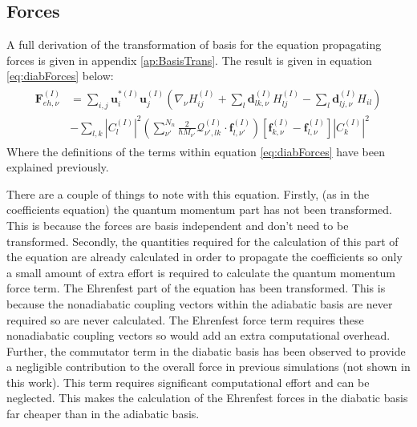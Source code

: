 \subsection{Forces}
A full derivation of the transformation of basis for the equation propagating forces is given in appendix \ref{ap:BasisTrans}. The result is given in equation \eqref{eq:diabForces} below:
\begin{align}
  \begin{split}
	  \mathbf{F}_{eh, \nu}^{(I)} &= \sum_{i,j} \mathbf{u}_{i}^{*(I)} \mathbf{u}_{j}^{(I)} \left( \nabla_{\nu} H_{ij}^{(I)} + \sum_{l} \mathbf{d}_{lk, \nu}^{(I)} H_{lj}^{(I)} - \sum_{l} \mathbf{d}_{lj, \nu}^{(I)} H_{il} \right) \\
	  &- \sum_{l,k} |C_{l}^{(I)}|^2 \left( \sum_{\nu'}^{N_{n}} \frac{2}{\hbar M_{\nu'}} \mathcal{Q}_{\nu', lk}^{(I)} \cdot                   \mathbf{f}_{l, \nu'}^{(I)} \right)\left[ \mathbf{f}_{k, \nu}^{(I)} -          \mathbf{f}_{l, \nu}^{(I)} \right] |C_{k}^{(I)}|^2
	\end{split}
  \label{eq:diabForces}
\end{align}
Where the definitions of the terms within equation \eqref{eq:diabForces} have been explained previously.

\noindent There are a couple of things to note with this equation. Firstly, (as in the coefficients equation) the quantum momentum part has not been transformed. This is because the forces are basis independent and don't need to be transformed. Secondly, the quantities required for the calculation of this part of the equation are already calculated in order to propagate the coefficients so only a small amount of extra effort is required to calculate the quantum momentum force term. The Ehrenfest part of the equation has been transformed. This is because the nonadiabatic coupling vectors within the adiabatic basis are never required so are never calculated. The Ehrenfest force term requires these nonadiabatic coupling vectors so would add an extra computational overhead. Further, the commutator term in the diabatic basis has been observed to provide a negligible contribution to the overall force in previous simulations (not shown in this work). This term requires significant computational effort and can be neglected. This makes the calculation of the Ehrenfest forces in the diabatic basis far cheaper than in the adiabatic basis.


